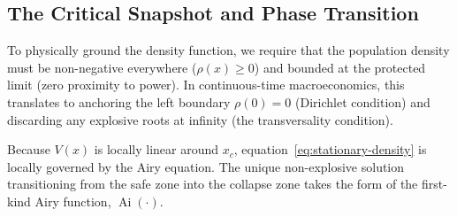 \subsection{The Critical Snapshot and Phase Transition}

To physically ground the density function, we require that the population density must be non-negative everywhere ($\rho(x) \ge 0$) and bounded at the protected limit (zero proximity to power). In continuous-time macroeconomics, this translates to anchoring the left boundary $\rho(0) = 0$ (Dirichlet condition) and discarding any explosive roots at infinity (the transversality condition).

Because $V(x)$ is locally linear around $x_c$, equation~\eqref{eq:stationary-density} is locally governed by the Airy equation. The unique non-explosive solution transitioning from the safe zone into the collapse zone takes the form of the first-kind Airy function, $\operatorname{Ai}(\cdot)$. 

